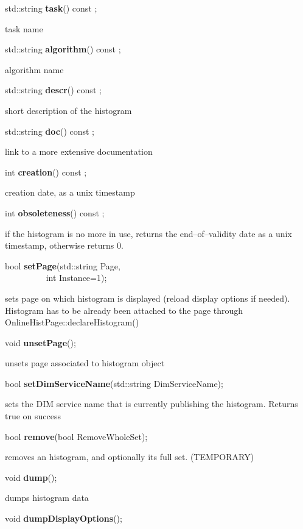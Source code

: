 \item    std::string {\bf task}() const ;

 task name


\item    std::string {\bf algorithm}() const ;

 algorithm name


\item    std::string {\bf descr}() const ;

 short description of the histogram


\item    std::string {\bf doc}() const ;

 link to a more extensive documentation


\item    int {\bf creation}() const ;

 creation date, as a unix timestamp


\item    int {\bf obsoleteness}() const ;

 if the histogram is no more in use, returns the end--of--validity date
 as a unix timestamp, otherwise returns 0.


\item    bool {\bf setPage}(std::string Page,\\\mbox{}~~~~~~~~~
	       int Instance=1);

 sets page on which histogram is displayed (reload display options if needed). Histogram has to be already
 been attached to the page through OnlineHistPage::declareHistogram()


\item    void {\bf unsetPage}();


 unsets page associated to histogram object


\item    bool {\bf setDimServiceName}(std::string DimServiceName);


 sets the DIM service name that is currently publishing the histogram. Returns true on success


\item    bool {\bf remove}(bool RemoveWholeSet);


 removes an histogram, and optionally its full set. (TEMPORARY)


\item    void {\bf dump}();


 dumps histogram data


\item    void {\bf dumpDisplayOptions}();


